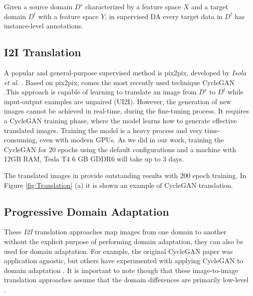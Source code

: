 \documentclass[10pt,twocolumn,letterpaper]{article}
\begin{document}
Given a source domain \(\mathit{D^s}\) characterized by a feature space \(\mathit{X}\) and a target domain \(\mathit{D^t}\) with a feature space \(\mathit{Y}\), in supervised DA every target data in \(\mathit{D^t}\) has instance-level annotations.


\subsection{I2I Translation}

A popular and general-purpose supervised method is pix2pix, developed by {\it Isola et al.} \cite{isola2018imagetoimage}. Based on pix2pix, comes the most recently used technique CycleGAN \cite{CGAN}.This approach is capable of learning to translate an image from \(\mathit{D^s}\) to \(\mathit{D^t}\) while input-output examples are unpaired (UI2I). However, the generation of new images cannot be achieved in real-time, during the fine-tuning process. It requires a CycleGAN training phase, where the model learns how to generate effective translated images. Training the model is a heavy process and very time-consuming, even with modern GPUs. 
As we did in our work, training the CycleGAN for 20 epochs using the default configurations and a machine with 12GB RAM, Tesla T4 6 GB GDDR6 will take up to 3 days.

The translated images in \cite{CGAN} provide outstanding results with 200 epoch training. In Figure \ref{fig:Translation} (a) it is shown an example of CycleGAN translation.

\subsection{Progressive Domain Adaptation}

These {\it I2I} translation approaches map images from one domain to another without the explicit purpose of performing domain adaptation, they can also be used for domain adaptation. For example, the original CycleGAN paper was application agnostic, but others have experimented with applying CycleGAN to domain adaptation \cite{benaim2017onesided,fu2018geometryconsistent,hoffman2017cycada}. It is important to note though that these image-to-image translation approaches assume that the domain differences are primarily low-level \cite{bousmalis2017unsupervised,bousmalis2017using,tzeng2017adversarial}.
\end{document}
